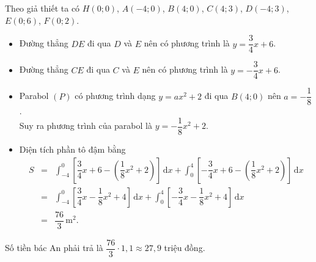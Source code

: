 \begin{bt}
{\begin{center}
\begin{tikzpicture}[line cap=butt,line join=miter,>=stealth,font=\normalsize,scale=.7]
				\end{tikzpicture}
		\end{center}
		Theo giả thiết ta có 
		 $H(0; 0)$, $A(-4; 0)$, $B(4; 0)$, $C(4; 3)$, $D(-4; 3)$, $E(0; 6)$, $F(0; 2)$.
		\begin{itemize}
			\item Đường  thẳng $DE$ đi qua $D$ và $E$ nên có phương trình là $y=\dfrac{3}{4} x+6$.
			\item Đường thẳng $CE$ đi qua $C$  và $E$ nên có phương trình là $y=-\dfrac{3}{4} x+6$.
			\item Parabol $(P)$ có phương trình  dạng $y=a x^2+2$ đi qua $B(4; 0)$ nên $a=-\dfrac{1}{8}$. \\
			Suy ra phương trình của  parabol là $y=-\dfrac{1}{8} x^2+2$.
			\item  Diện tích phần tô đậm bằng
			 \allowdisplaybreaks
			\begin{eqnarray*}
				S&=&\displaystyle\int_{-4}^0\left[\dfrac{3}{4}  x+6-\left(\dfrac{1}{8} x^2+2\right)\right] \mathrm{\,d}x+\displaystyle\int_0^4\left[-\dfrac{3}{4} x+6-\left(\dfrac{1}{8} x^2+2\right)\right] \mathrm{\,d}x\\
				 &=&\displaystyle\int_{-4}^0\left[\dfrac{3}{4} x-\dfrac{1}{8} x^2+4\right] \mathrm{\,d}x+\displaystyle\int_0^4\left[-\dfrac{3}{4} x-\dfrac{1}{8} x^2+4\right] \mathrm{\,d}x\\
				&=&\dfrac{76}{3}\,\mathrm{m}^2. 
			\end{eqnarray*}
		\end{itemize}
		Số tiền bác An phải trả là $\dfrac{76}{3} \cdot  1{,}1\approx 27{,}9$ triệu đồng.
	 }
\end{bt}

